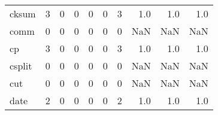 \begin{longtable}{lrrrrrrrrr}
cksum     &                                       3 &                                                  0 &                                                  0 &                                                  0 &                                                  0 &                                                  3 &                                                1.0 &                                    1.0 &                                  1.0 \\
comm      &                                       0 &                                                  0 &                                                  0 &                                                  0 &                                                  0 &                                                  0 &                                                NaN &                                    NaN &                                  NaN \\
cp        &                                       3 &                                                  0 &                                                  0 &                                                  0 &                                                  0 &                                                  3 &                                                1.0 &                                    1.0 &                                  1.0 \\
csplit    &                                       0 &                                                  0 &                                                  0 &                                                  0 &                                                  0 &                                                  0 &                                                NaN &                                    NaN &                                  NaN \\
cut       &                                       0 &                                                  0 &                                                  0 &                                                  0 &                                                  0 &                                                  0 &                                                NaN &                                    NaN &                                  NaN \\
date      &                                       2 &                                                  0 &                                                  0 &                                                  0 &                                                  0 &                                                  2 &                                                1.0 &                                    1.0 &                                  1.0 \\

\end{longtable}
